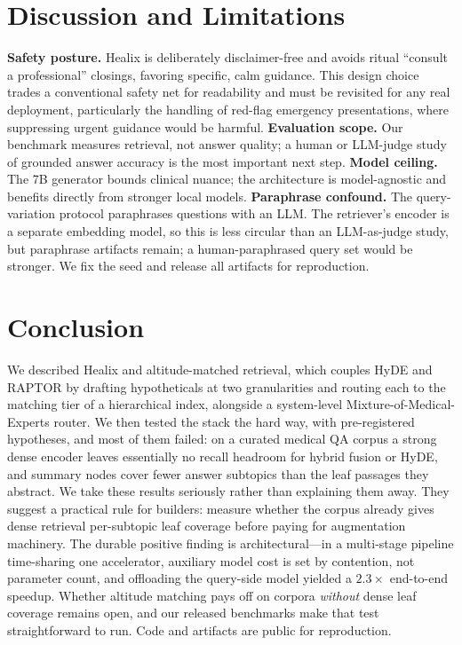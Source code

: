 \documentclass[conference]{IEEEtran}
\begin{document}
\section{Discussion and Limitations}
\textbf{Safety posture.} Healix is deliberately disclaimer-free and avoids
ritual ``consult a professional'' closings, favoring specific, calm guidance.
This design choice trades a conventional safety net for readability and must be
revisited for any real deployment, particularly the handling of red-flag
emergency presentations, where suppressing urgent guidance would be harmful.
\textbf{Evaluation scope.} Our benchmark measures retrieval, not answer quality;
a human or LLM-judge study of grounded answer accuracy is the most important next
step. \textbf{Model ceiling.} The 7B generator bounds clinical nuance; the
architecture is model-agnostic and benefits directly from stronger local models.
\textbf{Paraphrase confound.} The query-variation protocol paraphrases questions
with an LLM. The retriever's encoder is a separate embedding model, so this is
less circular than an LLM-as-judge study, but paraphrase artifacts remain; a
human-paraphrased query set would be stronger. We fix the seed and release all
artifacts for reproduction.

\section{Conclusion}
We described Healix and altitude-matched retrieval, which couples HyDE and RAPTOR
by drafting hypotheticals at two granularities and routing each to the matching
tier of a hierarchical index, alongside a system-level Mixture-of-Medical-Experts
router. We then tested the stack the hard way, with pre-registered hypotheses,
and most of them failed: on a curated medical QA corpus a strong dense encoder
leaves essentially no recall headroom for hybrid fusion or HyDE, and summary
nodes cover fewer answer subtopics than the leaf passages they abstract. We take
these results seriously rather than explaining them away. They suggest a
practical rule for builders: measure whether the corpus already gives dense
retrieval per-subtopic leaf coverage before paying for augmentation machinery.
The durable positive finding is architectural---in a multi-stage pipeline
time-sharing one accelerator, auxiliary model cost is set by contention, not
parameter count, and offloading the query-side model yielded a $2.3\times$
end-to-end speedup. Whether altitude matching pays off on corpora \emph{without}
dense leaf coverage remains open, and our released benchmarks make that test
straightforward to run. Code and artifacts are public for reproduction.
\end{document}
